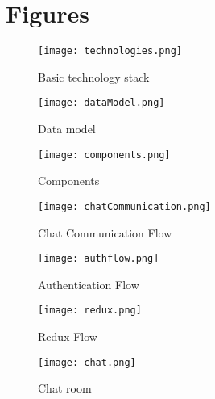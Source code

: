 \newpage
\appendix
\FloatBarrier
\section{Figures}
\begin{figure}[!ht]
	\begin{center}
		\texttt{[image: technologies.png]}
		\caption{Basic technology stack}
		\label{technologies}
	\end{center}
\end{figure}

\begin{figure}[!ht]
	\begin{center}
		\texttt{[image: dataModel.png]}
		\caption{Data model}
		\label{dataModel}
	\end{center}
\end{figure}

\begin{figure}[!ht]
	\begin{center}
		\texttt{[image: components.png]}
		\caption{Components}
		\label{components}
	\end{center}
\end{figure}

\begin{figure}[!ht]
	\begin{center}
		\texttt{[image: chatCommunication.png]}
		\caption{Chat Communication Flow}
		\label{chatCommunication}
	\end{center}
\end{figure}

\begin{figure}[!ht]
	\begin{center}
		\texttt{[image: authflow.png]}
		\caption{Authentication Flow}
		\label{authflow}
	\end{center}
\end{figure}

\begin{figure}[!ht]
	\begin{center}
		\texttt{[image: redux.png]}
		\caption{Redux Flow}
		\label{redux}
	\end{center}
\end{figure}

\begin{figure}[!ht]
	\begin{center}
		\texttt{[image: chat.png]}
		\caption{Chat room}
		\label{chat}
	\end{center}
\end{figure}

